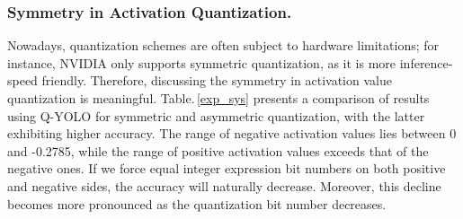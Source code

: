 \documentclass[runningheads]{llncs}
\begin{document}
\subsubsection{Symmetry in Activation Quantization.}
Nowadays, quantization schemes are often subject to hardware limitations; for instance, NVIDIA\cite{nvidia} only supports symmetric quantization, as it is more inference-speed friendly. Therefore, discussing the symmetry in activation value quantization is meaningful. Table.\,\ref{exp_sys} presents a comparison of results using Q-YOLO for symmetric and asymmetric quantization, with the latter exhibiting higher accuracy. The range of negative activation values lies between 0 and -0.2785, while the range of positive activation values exceeds that of the negative ones. If we force equal integer expression bit numbers on both positive and negative sides, the accuracy will naturally decrease. Moreover, this decline becomes more pronounced as the quantization bit number decreases.
\end{document}

